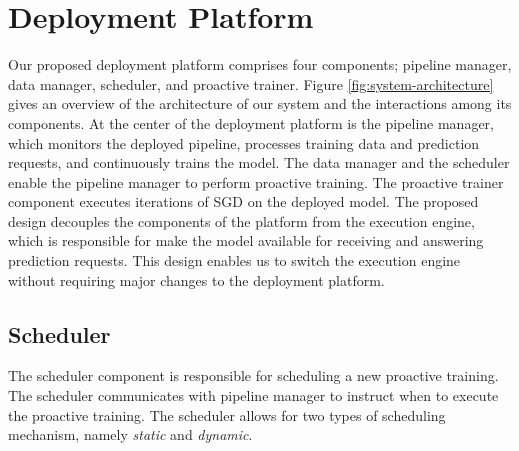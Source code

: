 \section{Deployment Platform} \label{sec:system-architecture}
Our proposed deployment platform comprises four components; pipeline manager, data manager, scheduler, and proactive trainer.
Figure \ref{fig:system-architecture} gives an overview of the architecture of our system and the interactions among its components.
At the center of the deployment platform is the pipeline manager, which monitors the deployed pipeline, processes training data and prediction requests, and continuously trains the model.
The data manager and the scheduler enable the pipeline manager to perform proactive training.
The proactive trainer component executes iterations of SGD on the deployed model.
The proposed design decouples the components of the platform from the execution engine, which is responsible for make the model available for receiving and answering prediction requests.
This design enables us to switch the execution engine without requiring major changes to the deployment platform.

\subsection{Scheduler}\label{scheduler}
The scheduler component is responsible for scheduling a new proactive training.
The scheduler communicates with pipeline manager to instruct when to execute the proactive training.
The scheduler allows for two types of scheduling mechanism, namely \textit{static} and \textit{dynamic}.

